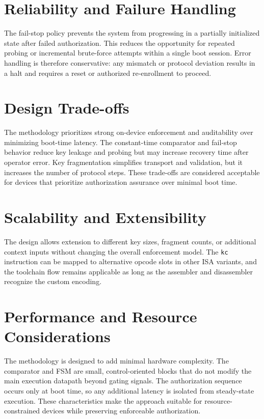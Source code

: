\section{Reliability and Failure Handling}
The fail-stop policy prevents the system from progressing in a partially initialized state
after failed authorization. This reduces the opportunity for repeated probing or incremental
brute-force attempts within a single boot session. Error handling is therefore conservative:
any mismatch or protocol deviation results in a halt and requires a reset or authorized
re-enrollment to proceed.

\section{Design Trade-offs}
The methodology prioritizes strong on-device enforcement and auditability over minimizing
boot-time latency. The constant-time comparator and fail-stop behavior reduce key leakage
and probing but may increase recovery time after operator error. Key fragmentation simplifies
transport and validation, but it increases the number of protocol steps. These trade-offs are
considered acceptable for devices that prioritize authorization assurance over minimal boot
time.

\section{Scalability and Extensibility}
The design allows extension to different key sizes, fragment counts, or additional context
inputs without changing the overall enforcement model. The \texttt{kc} instruction can be
mapped to alternative opcode slots in other ISA variants, and the toolchain flow remains
applicable as long as the assembler and disassembler recognize the custom encoding.

\section{Performance and Resource Considerations}
The methodology is designed to add minimal hardware complexity. The comparator and FSM are
small, control-oriented blocks that do not modify the main execution datapath beyond
gating signals. The authorization sequence occurs only at boot time, so any additional
latency is isolated from steady-state execution. These characteristics make the approach
suitable for resource-constrained devices while preserving enforceable authorization.

